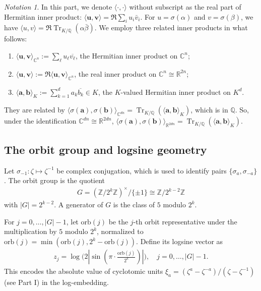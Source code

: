 \documentclass[11pt,a4paper]{article}
\theoremstyle{plain}
\theoremstyle{definition}
\theoremstyle{remark}
\newtheorem{notation}{Notation}
\DeclareMathOperator{\Tr}{Tr}
\newcommand{\Z}{\mathbb{Z}}
\newcommand{\Q}{\mathbb{Q}}
\newcommand{\R}{\mathbb{R}}
\newcommand{\C}{\mathbb{C}}
\begin{document}
\begin{notation}\label{not1:partII}
In this part, we denote $\langle\cdot, \cdot\rangle$ without subscript as the real part of Hermitian inner product: $\langle \mathbf{u}, \mathbf{v}\rangle=\Re\sum_i u_i\bar v_i$. For $u=\sigma(\alpha)$ and $v=\sigma(\beta)$, we have $\langle u, v\rangle=\Re\Tr_{K/\Q}(\alpha\bar\beta)$. We employ three related inner products in what follows:
\begin{enumerate}[label=(\roman*),nosep]
  \item $\langle \mathbf{u}, \mathbf{v}\rangle_{\C^n}:=\sum_\ell u_\ell\overline{v_\ell}$, the Hermitian inner product on $\C^n$;
  
  \item $\langle \mathbf{u}, \mathbf{v}\rangle:= \Re\langle\mathbf{u}, \mathbf{v}\rangle_{\C^n}$, the real inner product on $\C^n\cong\R^{2n}$;
  
  \item $\langle\mathbf{a}, \mathbf{b}\rangle_K:= \sum_{k=1}^d a_k\overline{b_k}\in K$, the $K$-valued Hermitian inner product on $K^d$.
\end{enumerate}
\end{notation}
They are related by $\langle\sigma(\mathbf{a}), \sigma(\mathbf{b})\rangle_{\C^{dn}}= \Tr_{K/\Q}(\langle\mathbf{a}, \mathbf{b}\rangle_K)$, which is in $\Q$. So, under the identification $\C^{dn}\cong\R^{2dn}$, $\langle\sigma(\mathbf{a}), \sigma(\mathbf{b})\rangle_{\R^{2dn}}=\Tr_{K/\Q}(\langle\mathbf{a}, \mathbf{b}\rangle_K)$.

\subsection{The orbit group and logsine geometry}\label{subsec:orbit}

Let $\sigma_{-1}: \zeta\mapsto\zeta^{-1}$ be complex conjugation, which is used to identify pairs $\{\sigma_a, \sigma_{-a}\}$. The orbit group is the quotient
\begin{align}
  G=(\Z/2^k\Z)^\times/\{\pm 1\} \cong \Z/2^{k-2}\Z
  \label{E:orbgroup}
\end{align}
with $|G|=2^{k-2}$. A generator of $G$ is the class of $5$ modulo $2^k$.

For $j=0, \dots, |G|-1$, let $\mathrm{orb}(j)$ be the $j$-th orbit representative under the multiplication by $5$ modulo $2^k$, normalized to $\mathrm{orb}(j)=\min(\mathrm{orb}(j), 2^k-\mathrm{orb}(j))$. Define its logsine vector as
\begin{align}
  z_j=\log\bigl(2|\sin(\pi\cdot \frac{\mathrm{orb}(j)}{2^k})|\bigr), \quad j=0, \dots, |G|-1.
  \label{E:logsine}
\end{align}
This encodes the absolute value of cyclotomic units $\xi_a=(\zeta^a-\zeta^{-a})/(\zeta-\zeta^{-1})$ (see Part I) in the log-embedding.
\end{document}
